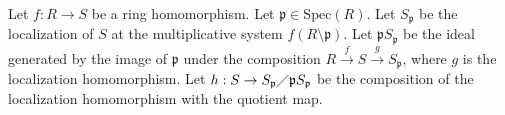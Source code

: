 \documentclass[12pt, letterpaper]{article}
\newcommand{\p}{\mathfrak{p}}
\newcommand{\Spec}{\mathrm{Spec}}
\begin{document}
\color{\TextColor}
\pagecolor{\colormode}
\setlength{\parindent}{0pt}
\pagestyle{fancy}
\fancyhf{}

\begin{problem}{}
    Let $f : R \to S$ be a ring homomorphism. Let $\p \in \Spec(R)$. Let $S_\p$ be the localization of
    $S$ at the multiplicative system $f (R \setminus \p)$. Let $\p S_\p$ be the ideal generated by the image of
    $\p$ under the composition $R \overset{f}{\to}  S \overset{g}{\to} S_\p$, where $g$ is the localization homomorphism. Let
    $h : S \to S_\p \diagup \p S_\p$ be the composition of the localization homomorphism with the quotient
    map.
\end{problem}
\end{document}

